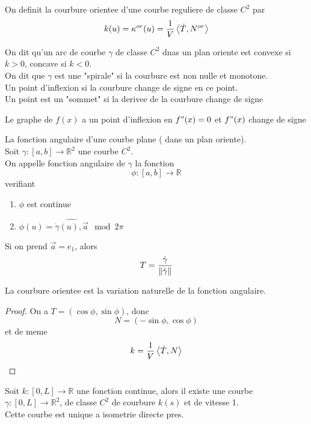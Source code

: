 \documentclass[../main.tex]{subfiles}
\begin{document}
On definit la courbure orientee d'une courbe reguliere de classe $C^{2}$ par
\[ 
	k( u) = \kappa^{or}( u) = \frac{1}{V} \left\langle \dot T, N^{or}\right\rangle 		
\]
\begin{defn}
	On dit qu'un arc de courbe $\gamma$ de classe $C^{2}$ dnas un plan oriente est convexe si $k>0 $, concave si $k<0$.\\
	On dit que $\gamma$ est une "spirale" si la courbure est non nulle et monotone.\\
	Un point d'inflexion si la courbure change de signe en ce point.\\
	Un point est un "sommet" si la derivee de la courbure change de signe
\end{defn}
\begin{rmq}
	Le graphe de $f( x) $ a un point d'inflexion en $f"( x) =0$ et $f"( x) $ change de signe
\end{rmq}
\begin{defn}
	La fonction angulaire d'une courbe plane ( dans un plan oriente).\\
	Soit $\gamma: [ a,b] \to \mathbb{R}^{2}$ une courbe $C^{2}$.\\
	On appelle fonction angulaire de $\gamma$ la fonction
	\[ 
	\phi: [ a,b] \to \mathbb{R}
	\]
	verifiant 
	\begin{enumerate}
	\item $\phi$ est continue
	\item $\phi( u) = \hat{ \dot \gamma ( u) , \vec{a}} \mod 2\pi$ 
	\end{enumerate}
	
\end{defn}
\begin{rmq}
Si on prend $\vec{a}= e_1$, alors
\[ 
T = \frac{\dot\gamma}{\left\lVert \dot\gamma \right\rVert}
\]

\end{rmq}
\begin{propo}
La courbure orientee est la variation naturelle de la fonction angulaire.
\end{propo}
\begin{proof}
	On a $T= ( \cos\phi,\sin\phi) $, donc 
	\[ 
		N = ( -\sin\phi,\cos\phi) 
	\]
	et de meme
	\[ 
	k= \frac{1}{V}\left\langle \dot T, N\right\rangle 
	\]
	
\end{proof}
\begin{thm}
	Soit $k: [ 0,L] \to \mathbb{R}$ une fonction continue, alors il existe une courbe $\gamma: [ 0,L] \to \mathbb{R}^{2}$, de classe $C^{2}$ de courbure $k( s)$ et de vitesse 1.\\
	Cette courbe est unique a isometrie directe pres.
\end{thm}
\end{document}
